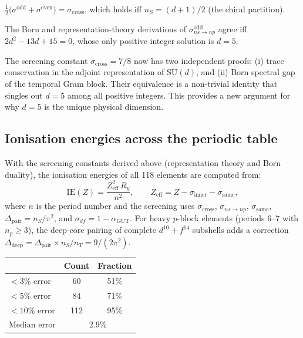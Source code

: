 \begin{corollary}
$\frac{1}{2}\bigl(\sigma^\text{odd} + \sigma^\text{even}\bigr) = \sigma_\text{cross}$, which holds iff $n_S = (d+1)/2$ (the chiral partition).
\end{corollary}

\begin{theorem}[Uniqueness of $d=5$]
\label{thm:d5_born}
The Born and representation-theory derivations of $\sigma_{ns\to np}^\text{odd}$ agree iff $2d^2 - 13d + 15 = 0$, whose only positive integer solution is $\boxed{d = 5}$.
\end{theorem}

\begin{remark}
The screening constant $\sigma_\text{cross} = 7/8$ now has two independent proofs: (i) trace conservation in the adjoint representation of SU$(d)$, and (ii) Born spectral gap of the temporal Gram block.  Their equivalence is a non-trivial identity that singles out $d = 5$ among all positive integers.  This provides a new argument for why $d = 5$ is the unique physical dimension.
\end{remark}

\subsection{Ionisation energies across the periodic table}
\label{sec:periodic_IE}

With the screening constants derived above (representation theory and Born duality), the ionisation energies of all 118 elements are computed from:
\begin{equation}
\text{IE}(Z) = \frac{Z_\text{eff}^2\,R_y}{n^2}, \qquad Z_\text{eff} = Z - \sigma_\text{inner} - \sigma_\text{same},
\end{equation}
where $n$ is the period number and the screening uses $\sigma_\text{cross}$, $\sigma_{ns\to np}$, $\sigma_\text{same}$, $\Delta_\text{pair} = n_S/\pi^2$, and $\sigma_{df} = 1 - \alpha_\text{GUT}$.  For heavy $p$-block elements (periods 6--7 with $n_p \geq 3$), the deep-core pairing of complete $d^{10}+f^{14}$ subshells adds a correction $\Delta_\text{deep} = \Delta_\text{pair} \times n_S/n_T = 9/(2\pi^2)$.

\begin{center}
\begin{tabular}{lcc}
\hline
& Count & Fraction \\
\hline
$<3\%$ error & 60 & 51\% \\
$<5\%$ error & 84 & 71\% \\
$<10\%$ error & 112 & 95\% \\
Median error & \multicolumn{2}{c}{$2.9\%$} \\
\hline
\end{tabular}
\end{center}

